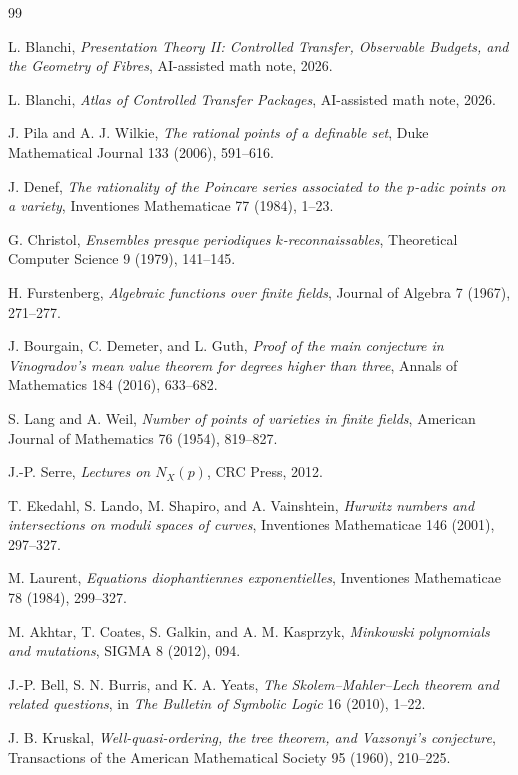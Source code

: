 \documentclass[11pt]{article}
\begin{document}
\begin{thebibliography}{99}

L. Blanchi,
\emph{Presentation Theory II: Controlled Transfer, Observable Budgets, and the Geometry of Fibres},
AI-assisted math note, 2026.

L. Blanchi,
\emph{Atlas of Controlled Transfer Packages},
AI-assisted math note, 2026.

J. Pila and A. J. Wilkie,
\emph{The rational points of a definable set},
Duke Mathematical Journal 133 (2006), 591--616.

J. Denef,
\emph{The rationality of the Poincare series associated to the \(p\)-adic points on a variety},
Inventiones Mathematicae 77 (1984), 1--23.

G. Christol,
\emph{Ensembles presque periodiques \(k\)-reconnaissables},
Theoretical Computer Science 9 (1979), 141--145.

H. Furstenberg,
\emph{Algebraic functions over finite fields},
Journal of Algebra 7 (1967), 271--277.

J. Bourgain, C. Demeter, and L. Guth,
\emph{Proof of the main conjecture in Vinogradov's mean value theorem for degrees higher than three},
Annals of Mathematics 184 (2016), 633--682.

S. Lang and A. Weil,
\emph{Number of points of varieties in finite fields},
American Journal of Mathematics 76 (1954), 819--827.

J.-P. Serre,
\emph{Lectures on \(N_X(p)\)},
CRC Press, 2012.

T. Ekedahl, S. Lando, M. Shapiro, and A. Vainshtein,
\emph{Hurwitz numbers and intersections on moduli spaces of curves},
Inventiones Mathematicae 146 (2001), 297--327.

M. Laurent,
\emph{Equations diophantiennes exponentielles},
Inventiones Mathematicae 78 (1984), 299--327.

M. Akhtar, T. Coates, S. Galkin, and A. M. Kasprzyk,
\emph{Minkowski polynomials and mutations},
SIGMA 8 (2012), 094.

J.-P. Bell, S. N. Burris, and K. A. Yeats,
\emph{The Skolem--Mahler--Lech theorem and related questions},
in \emph{The Bulletin of Symbolic Logic} 16 (2010), 1--22.

J. B. Kruskal,
\emph{Well-quasi-ordering, the tree theorem, and Vazsonyi's conjecture},
Transactions of the American Mathematical Society 95 (1960), 210--225.

\end{thebibliography}
\end{document}

